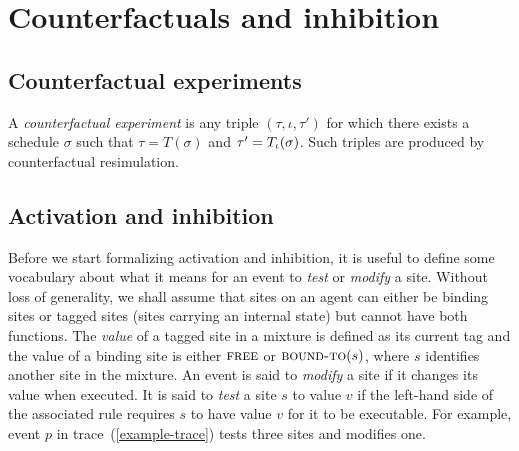 
\section{Counterfactuals and inhibition}\label{sec:inhibition}


\subsection{Counterfactual experiments}

A \textit{counterfactual experiment} is any triple
$(\tau, \iota, \tau')$ for which there exists a schedule $\sigma$ such
that $\tau = T(\sigma)$ and $\tau' = {T_\iota}{}(\sigma)$. Such triples
are produced by counterfactual resimulation.

\subsection{Activation and inhibition}


Before we start formalizing activation and inhibition, it is useful to
define some vocabulary about what it means for an event to \emph{test}
or \emph{modify} a site. Without loss of generality, we shall assume
that sites on an agent can either be binding sites or tagged sites
(sites carrying an internal state) but cannot have both functions. The
\textit{value} of a tagged site in a mixture is defined as its current
tag and the value of a binding site is either $\textsc{free}$ or
$\textsc{bound-to}(s)$, where $s$ identifies another site in the
mixture.  An event is said to \emph{modify} a site if it changes its
value when executed. It is said to \emph{test} a site $s$ to value $v$
if the left-hand side of the associated rule requires $s$ to have
value $v$ for it to be executable. For example, event $p$ in
trace~(\ref{example-trace}) tests three sites and modifies one.





